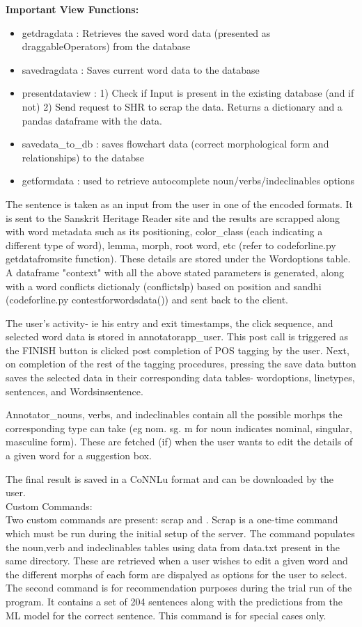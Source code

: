 \documentclass[12pt]{article}
\begin{document}
\textbf{Important View Functions:}
\begin{itemize}
	\item  getdragdata : Retrieves the saved word data (presented as draggableOperators) from the database
	\item  savedragdata : Saves current word data to the database
	\item  presentdataview : 1) Check if Input is present in the existing database (and if not) 2) Send request to SHR to scrap the data. Returns a dictionary and a pandas dataframe with the data.
	\item  savedata\_to\_db : saves flowchart data (correct morphological form and relationships) to the databse
	\item  getformdata : used to retrieve autocomplete noun/verbs/indeclinables options
\end{itemize}

The sentence is taken as an input from the user in one of the encoded formats. It is sent to the Sanskrit Heritage Reader site and the results are scrapped along with word metadata such as its positioning, color\_class (each indicating a different type of word), lemma, morph, root word, etc (refer to codeforline.py getdatafromsite function). These details are stored under the Wordoptions table. A dataframe "context" with all the above stated parameters is generated, along with a word conflicts dictionaly (conflictslp) based on position and sandhi (codeforline.py contestforwordsdata()) and sent back to the client.

The user's activity- ie his entry and exit timestamps, the click sequence, and selected word data is stored in annotatorapp\_user. This post call is triggered as the FINISH button is clicked post completion of POS tagging by the user. Next, on completion of the rest of the tagging procedures, pressing the save data button saves the selected data in their corresponding data tables- wordoptions, linetypes, sentences, and Wordsinsentence. 

Annotator\_nouns, verbs, and indeclinables contain all the possible morhps the corresponding type can take (eg nom. sg. m for noun indicates nominal, singular, masculine form). These are fetched (if) when the user wants to edit the details of a given word for a suggestion box. 

The final result is saved in a CoNNLu format and can be downloaded by the user.
\\ Custom Commands:
\\ Two custom commands are present: scrap and . Scrap is a one-time command which must be run during the initial setup of the server. The command populates the noun,verb and indeclinables tables using data from data.txt present in the same directory. These are retrieved when a user wishes to edit a given word and the different morphs of each form are dispalyed as options for the user to select. \\ The second command is for recommendation purposes during the trial run of the program. It contains a set of 204 sentences along with the predictions from the ML model for the correct sentence. This command is for special cases only.
\end{document}
